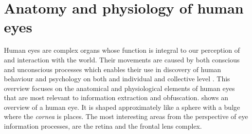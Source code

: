 




\section{Anatomy and physiology of human eyes}\label{sec:anatomy}
Human eyes are complex organs whose function is integral to our perception of and interaction with the world. Their movements are caused by both conscious and unconscious processes which enables their use in discovery of human behaviour and psychology on both and individual and collective level \parencite{methodology}. This overview focuses on the anatomical and physiological elements of human eyes that are most relevant to information extraction and obfuscation.  shows an overview of a human eye. It is shaped approximately like a sphere with a bulge where the \emph{cornea} is places. The most interesting areas from the perspective of eye information processes, are the retina and the frontal lens complex. 




